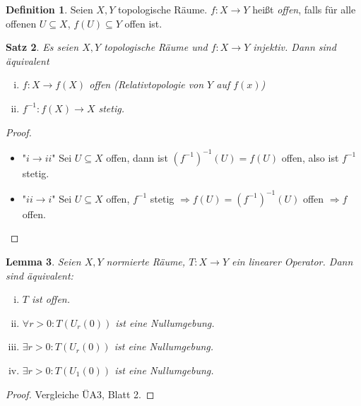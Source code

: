 \documentclass[ngerman]{report}
\theoremstyle{plain}%
\newtheorem{thm}{Satz}[chapter]
\newtheorem{lemma}[thm]{Lemma}
\theoremstyle{definition}%
\newtheorem{definition}[thm]{Definition}
\theoremstyle{myStyle}
\newcommand{\df}[1][]{%
	\overset{#1}{\Rightarrow}
}
\newcommand{\inv}[1]{#1^{-1}}
\newcommand{\qmarks}[1]{"#1"}
\begin{document}
	\begin{definition}
		Seien $X,Y$ topologische Räume. $f: X\to Y$ heißt \textit{offen}, falls für alle offenen $U\subseteq X$, $f(U)\subseteq Y$ offen ist.
	\end{definition}

	\begin{thm}
		Es seien $X,Y$ topologische Räume und $f: X\to Y$ injektiv. Dann sind äquivalent
		\begin{enumerate}[(i)]
			\item $f: X \to f(X)$ offen (Relativtopologie von $Y$ auf $f(x)$)	
			\item $\inv{f}: f(X) \to X$ stetig.
		\end{enumerate}
	\end{thm}
	\begin{proof}
		\begin{itemize}[]
			\item \qmarks{$i \to ii$} Sei $U \subseteq X$ offen, dann ist $ \inv{(\inv{f})}(U) = f(U)$ offen, also ist $\inv{f}$ stetig.
		\item \qmarks{$ii \to i$} Sei $U \subseteq X$ offen, $\inv{f}$ stetig 
			$\df f(U) = \inv{(\inv{f})}(U)$ offen $\df f $ offen.
		\end{itemize}
	\end{proof}

	\begin{lemma}
		Seien $X,Y$ normierte Räume, $T: X\to Y$ ein linearer Operator. Dann sind äquivalent:
			\begin{enumerate}[(i)]
				\item $T$ ist offen.
				\item $\forall r > 0: T(U_r(0))$ ist eine Nullumgebung.
				\item $\exists r > 0 : T(U_r(0))$ ist eine Nullumgebung.
				\item $\exists r > 0 : T(U_1(0))$ ist eine Nullumgebung.

			\end{enumerate}
	\end{lemma}
	\begin{proof}
	 Vergleiche ÜA3, Blatt 2.
	\end{proof}
\end{document}

